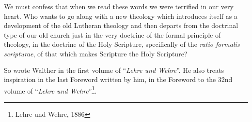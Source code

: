 \begin{fancyquotes}We must confess that when we read these words we were terrified in our very heart.  Who wants to go along with a new theology which introduces itself as a development of the old Lutheran theology and then departs from the doctrinal type of our old church just in the very doctrine of the formal principle of theology, in the doctrine of the Holy Scripture, specifically of the \textit{ratio formalis scripturae}, of that which makes Scripture the Holy Scripture?\end{fancyquotes} So wrote Walther in the first volume of ``\textit{Lehre und Wehre}''.  He also treats inspiration in the last Foreword written by him, in the Foreword to the 32nd volume of “\textit{Lehre und Wehre}”\footnote{Lehre und Wehre, 1886}.

